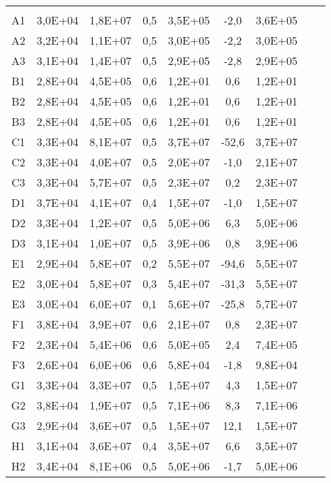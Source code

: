 \begin{center}
\begin{longtable}{ccccccccc}
\toprule
\endhead
\midrule \\ %
\endfoot
\bottomrule 
\endlastfoot
A1    & 3,0E+04 & 1,8E+07 & 0,5   & 3,5E+05 & -2,0  & 3,6E+05 \\
A2    & 3,2E+04 & 1,1E+07 & 0,5   & 3,0E+05 & -2,2  & 3,0E+05 \\
A3    & 3,1E+04 & 1,4E+07 & 0,5   & 2,9E+05 & -2,8  & 2,9E+05 \\
B1    & 2,8E+04 & 4,5E+05 & 0,6   & 1,2E+01 & 0,6   & 1,2E+01 \\
B2    & 2,8E+04 & 4,5E+05 & 0,6   & 1,2E+01 & 0,6   & 1,2E+01 \\
B3    & 2,8E+04 & 4,5E+05 & 0,6   & 1,2E+01 & 0,6   & 1,2E+01 \\
C1    & 3,3E+04 & 8,1E+07 & 0,5   & 3,7E+07 & -52,6 & 3,7E+07 \\
C2    & 3,3E+04 & 4,0E+07 & 0,5   & 2,0E+07 & -1,0  & 2,1E+07 \\
C3    & 3,3E+04 & 5,7E+07 & 0,5   & 2,3E+07 & 0,2   & 2,3E+07 \\
D1    & 3,7E+04 & 4,1E+07 & 0,4   & 1,5E+07 & -1,0  & 1,5E+07 \\
D2    & 3,3E+04 & 1,2E+07 & 0,5   & 5,0E+06 & 6,3   & 5,0E+06 \\
D3    & 3,1E+04 & 1,0E+07 & 0,5   & 3,9E+06 & 0,8   & 3,9E+06 \\
E1    & 2,9E+04 & 5,8E+07 & 0,2   & 5,5E+07 & -94,6 & 5,5E+07 \\
E2    & 3,0E+04 & 5,8E+07 & 0,3   & 5,4E+07 & -31,3 & 5,5E+07 \\
E3    & 3,0E+04 & 6,0E+07 & 0,1   & 5,6E+07 & -25,8 & 5,7E+07 \\
F1    & 3,8E+04 & 3,9E+07 & 0,6   & 2,1E+07 & 0,8   & 2,3E+07 \\
F2    & 2,3E+04 & 5,4E+06 & 0,6   & 5,0E+05 & 2,4   & 7,4E+05 \\
F3    & 2,6E+04 & 6,0E+06 & 0,6   & 5,8E+04 & -1,8  & 9,8E+04 \\
G1    & 3,3E+04 & 3,3E+07 & 0,5   & 1,5E+07 & 4,3   & 1,5E+07 \\
G2    & 3,8E+04 & 1,9E+07 & 0,5   & 7,1E+06 & 8,3   & 7,1E+06 \\
G3    & 2,9E+04 & 3,6E+07 & 0,5   & 1,5E+07 & 12,1  & 1,5E+07 \\
H1    & 3,1E+04 & 3,6E+07 & 0,4   & 3,5E+07 & 6,6   & 3,5E+07 \\
H2    & 3,4E+04 & 8,1E+06 & 0,5   & 5,0E+06 & -1,7  & 5,0E+06 \\

\end{longtable}
\end{center}
